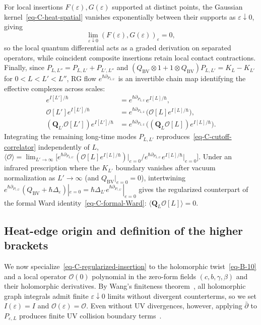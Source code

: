 \documentclass[11pt]{article}
\numberwithin{equation}{section}
\numberwithin{figure}{section}
\numberwithin{table}{section}
\begin{document}
For local insertions $F(\varepsilon),G(\varepsilon)$ supported at distinct points, the Gaussian kernel~\eqref{eq-C-heat-spatial} vanishes exponentially between their supports as $\varepsilon\downarrow0$, giving
\begin{equation}\label{eq-C-separated-insertions}
\lim_{\varepsilon\downarrow0}(F(\varepsilon),G(\varepsilon))_\varepsilon=0,
\end{equation}
so the local quantum differential acts as a graded derivation on separated operators, while coincident composite insertions retain local contact contractions. Finally, since $P_{L,L''}=P_{L,L'}+P_{L',L''}$ and $(Q_{\mathrm{BV}}\otimes1+1\otimes Q_{\mathrm{BV}})P_{L,L'}=K_L-K_{L'}$ for $0<L<L'<L''$, RG flow $e^{\hbar\partial_{P_{L,L'}}}$ is an invertible chain map identifying the effective complexes across scales:
\begin{equation}\label{eq-C-RG-transport}
\begin{aligned}
e^{I[L']/\hbar}&=e^{\hbar\partial_{P_{L,L'}}}e^{I[L]/\hbar},\\
\mathcal O[L']e^{I[L']/\hbar}&=e^{\hbar\partial_{P_{L,L'}}}\bigl(\mathcal O[L]e^{I[L]/\hbar}\bigr),\\
(\mathbf Q_{L'}\mathcal O[L'])e^{I[L']/\hbar}&=e^{\hbar\partial_{P_{L,L'}}}\bigl((\mathbf Q_L\mathcal O[L])e^{I[L]/\hbar}\bigr).
\end{aligned}
\end{equation}
Integrating the remaining long-time modes $P_{L,L'}$ reproduces~\eqref{eq-C-cutoff-correlator} independently of $L$, $\langle\mathcal O\rangle=\lim_{L'\to\infty}\bigl[e^{\hbar\partial_{P_{L,L'}}}(\mathcal O[L]e^{I[L]/\hbar})\bigr|_{e=0}\big/e^{\hbar\partial_{P_{L,L'}}}e^{I[L]/\hbar}\bigr|_{e=0}\bigr]$. Under an infrared prescription where the $K_{L'}$ boundary vanishes after vacuum normalization as $L'\to\infty$ (and $Q_{\mathrm{BV}}|_{e=0}=0$), intertwining $e^{\hbar\partial_{P_{\varepsilon,L'}}}(Q_{\mathrm{BV}}+\hbar\Delta_\varepsilon)|_{e=0}=\hbar\Delta_{L'}e^{\hbar\partial_{P_{\varepsilon,L'}}}|_{e=0}$ gives the regularized counterpart of the formal Ward identity~\eqref{eq-C-formal-Ward}: $\langle\mathbf Q_L\mathcal O[L]\rangle=0$.

\subsection{Heat-edge origin and definition of the higher brackets}\label{sec-brackets-origin}

We now specialize~\eqref{eq-C-regularized-insertion} to the holomorphic twist~\eqref{eq-B-10} and a local operator $\mathcal O(0)$ polynomial in the zero-form fields $(c,b,\gamma,\beta)$ and their holomorphic derivatives. By Wang's finiteness theorem~\cite[Theorem 5 and Corollary 4]{Wang}, all holomorphic graph integrals admit finite $\varepsilon\downarrow0$ limits without divergent counterterms, so we set $I(\varepsilon)=I$ and $\mathcal O(\varepsilon)=\mathcal O$. Even without UV divergences, however, applying $\bar\partial$ to $P_{\varepsilon,L}$ produces finite UV collision boundary terms~\cite[Theorem 6]{Wang}.
\end{document}
